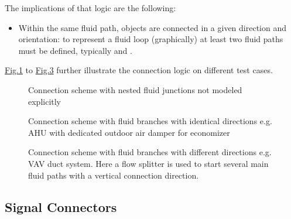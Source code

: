 \documentclass[letterpaper,10pt, openany,english]{sphinxmanual}
\begin{document}
The implications of that logic are the following:
\begin{itemize}
\item {} 
Within the same fluid path, objects are connected in a given direction and orientation: to represent a fluid loop (graphically) at least two fluid paths must be defined, typically  and .

\end{itemize}

\hyperref[\detokenize{requirements:linkage-connect-multi}]{Fig.\@ \ref{\detokenize{requirements:linkage-connect-multi}}} to \hyperref[\detokenize{requirements:linkage-connect-duct}]{Fig.\@ \ref{\detokenize{requirements:linkage-connect-duct}}} further illustrate the connection logic on different test cases.

\begin{figure}[htbp]
\centering
\capstart

\noindent{}
\caption{Connection scheme with nested fluid junctions not modeled explicitly}\label{\detokenize{requirements:linkage-connect-multi}}\end{figure}

\begin{figure}[htbp]
\centering
\capstart

\noindent{}
\caption{Connection scheme with fluid branches with identical directions e.g. AHU with dedicated outdoor air damper for economizer}\label{\detokenize{requirements:linkage-connect-dedicated}}\end{figure}

\begin{figure}[htbp]
\centering
\capstart

\noindent{}
\caption{Connection scheme with fluid branches with different directions e.g. VAV duct system. Here a flow splitter is used to start several main fluid paths with a vertical connection direction.}\label{\detokenize{requirements:linkage-connect-duct}}\end{figure}


\subsection{Signal Connectors}
\label{\detokenize{requirements:signal-connectors}}\label{\detokenize{requirements:par-signal-connectors}}
\end{document}
